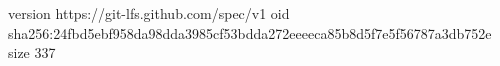 version https://git-lfs.github.com/spec/v1
oid sha256:24fbd5ebf958da98dda3985cf53bdda272eeeeca85b8d5f7e5f56787a3db752e
size 337

